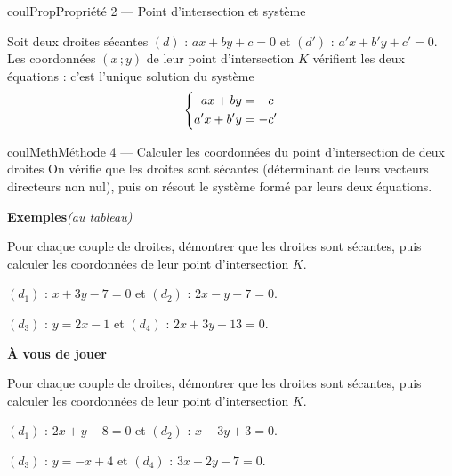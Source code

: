 \documentclass[11pt,a4paper]{article}
\makeatletter
\newcounter{lycee@signet}
\newcommand{\signet}[3][]{\stepcounter{lycee@signet}%
  \edef\lycee@dest{\if\relax\detokenize{#1}\relax
    signet.\arabic{lycee@signet}\else#1\fi}%
  \hypertarget{\lycee@dest}{}\bookmark[level=#2,dest=\lycee@dest]{#3}}
\newcounter{methode}
\newenvironment{proprietebox}[1][Propriété]%
  {\begin{boitecours}[phantom={\signet{2}{#1}}]{coulProp}{#1}}{\end{boitecours}}
\newenvironment{methodebox}[1][Méthode]{\stepcounter{methode}%
  \begin{boitecours}[phantom={\signet[methode-\arabic{methode}]{2}{#1}}]{coulMeth}{#1}}%
  {\end{boitecours}}
\newcommand{\etape}[1]{\par\smallskip\textbf{\color{coulMeth}#1}\par\nobreak\smallskip}
\newcommand{\autableau}{\hfill{\footnotesize\itshape\color{black!45}(au tableau)}}
\newcommand{\etapeexemples}{%
    \par\smallskip\textbf{\color{coulMeth}Exemples}\autableau\par\nobreak\smallskip}
\makeatother
\begin{document}
\begin{proprietebox}[Propriété 2 --- Point d'intersection et système]
\begin{minipage}[c]{0.62\linewidth}\raggedright
Soit deux droites sécantes $(d)$ : $ax+by+c=0$ et $(d')$ : $a'x+b'y+c'=0$. Les
coordonnées $(x\,;y)$ de leur point d'intersection $K$ vérifient les deux équations :
c'est l'unique solution du système
\[
  \left\{\begin{aligned}ax+by &= -c\\ a'x+b'y &= -c'\end{aligned}\right.
\]
\end{minipage}\hfill
\begin{minipage}[c]{0.34\linewidth}\centering
{}
\end{minipage}
\end{proprietebox}

\begin{methodebox}[Méthode 4 --- Calculer les coordonnées du point d'intersection de deux droites]
On vérifie que les droites sont sécantes (déterminant de leurs vecteurs directeurs non
nul), puis on résout le système formé par leurs deux équations.
\etapeexemples
Pour chaque couple de droites, démontrer que les droites sont sécantes, puis calculer
les coordonnées de leur point d'intersection $K$.
\begin{questions}[label=\alph*)]
  \item $(d_{1})$ : $x+3y-7=0$ et $(d_{2})$ : $2x-y-7=0$.
  \item $(d_{3})$ : $y=2x-1$ et $(d_{4})$ : $2x+3y-13=0$.
\end{questions}

\etape{À vous de jouer}
Pour chaque couple de droites, démontrer que les droites sont sécantes, puis calculer
les coordonnées de leur point d'intersection $K$.
\begin{questions}[label=\alph*)]
  \item $(d_{1})$ : $2x+y-8=0$ et $(d_{2})$ : $x-3y+3=0$.
  \item $(d_{3})$ : $y=-x+4$ et $(d_{4})$ : $3x-2y-7=0$.
\end{questions}

\end{methodebox}
\end{document}

